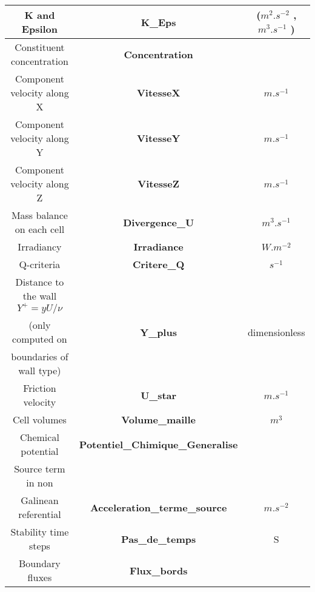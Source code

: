 \begin{itemize}
\begin{longtable}[hcr]{|c|c|c|}
K and Epsilon                                   & \textbf{K\_Eps}                           & ($m^2.s^{-2}$ ,$m^3.s^{-1}$ ) \\ \hline
Constituent concentration                       & \textbf{Concentration}                    & \\ \hline
Component velocity along X                      & \textbf{VitesseX}                         & $m.s^{-1}$ \\ \hline
Component velocity along Y                      & \textbf{VitesseY}                         & $m.s^{-1}$ \\ \hline
Component velocity along Z                      & \textbf{VitesseZ}                         & $m.s^{-1}$ \\ \hline
Mass balance on each cell                       & \textbf{Divergence\_U}                    & $m^3.s^{-1}$  \\ \hline
Irradiancy                                      & \textbf{Irradiance}                       & $W.m^{-2}$ \\ \hline
Q-criteria                                      & \textbf{Critere\_Q}                       & $s^{-1}$ \\ \hline
Distance to the wall $Y^+=yU/\nu$               &                                           & \\ 
(only computed on                               & \textbf{Y\_plus}                          & dimensionless \\ 
boundaries of wall type)                        &                                           &  \\ \hline
Friction velocity                               & \textbf{U\_star}                          & $m.s^{-1}$ \\ \hline
Cell volumes                                    & \textbf{Volume\_maille}                   & $m^3$ \\ \hline
Chemical potential                              & \textbf{Potentiel\_Chimique\_Generalise}  & \\ \hline
Source term in non                              &                                           & \\
Galinean referential                            & \textbf{Acceleration\_terme\_source}      & $m.s^{-2}$ \\ \hline
Stability time steps                            & \textbf{Pas\_de\_temps}                   & S \\ \hline
Boundary fluxes                                 & \textbf{Flux\_bords}                      & \\ \hline

\end{longtable}
\end{itemize}
